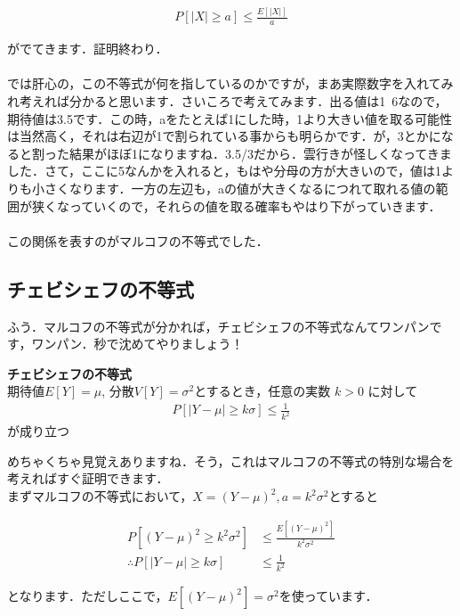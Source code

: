 \documentclass[11pt,a4paper,uplatex]{ujreport} 	%
\begin{document}
\begin{align}
  P[|X|\geq a] \leq \frac{E[|X|]}{a}
\end{align}

がでてきます．証明終わり．\\
\\

では肝心の，この不等式が何を指しているのかですが，まあ実際数字を入れてみれ考えれば分かると思います．さいころで考えてみます．出る値は1~6なので，期待値は3.5です．この時，aをたとえば1にした時，1より大きい値を取る可能性は当然高く，それは右辺が1で割られている事からも明らかです．が，3とかになると割った結果がほぼ1になりますね．3.5/3だから．雲行きが怪しくなってきました．さて，ここに5なんかを入れると，もはや分母の方が大きいので，値は1よりも小さくなります．一方の左辺も，aの値が大きくなるにつれて取れる値の範囲が狭くなっていくので，それらの値を取る確率もやはり下がっていきます．\\
\\

この関係を表すのがマルコフの不等式でした．

\subsection{チェビシェフの不等式}
ふう．マルコフの不等式が分かれば，チェビシェフの不等式なんてワンパンです，ワンパン．秒で沈めてやりましょう！

\begin{screen}
  \textbf{チェビシェフの不等式}\\
  期待値$E[Y] = \mu$, 分散$V[Y] = \sigma^2$とするとき，任意の実数 $k>0$ に対して
  \begin{align}
    P[|Y-\mu| \geq k\sigma] \leq \frac{1}{k^2}
    \label{eq:cheb}
  \end{align}
  が成り立つ
\end{screen}

めちゃくちゃ見覚えありますね．そう，これはマルコフの不等式の特別な場合を考えればすぐ証明できます．\\

まずマルコフの不等式において，$X=(Y-\mu)^2, a = k^2\sigma^2$とすると

\begin{align}
  P[(Y-\mu)^2 \geq k^2\sigma^2] &\leq \frac{E[(Y-\mu)^2]}{k^2\sigma^2}\\
  \therefore P[|Y-\mu| \geq k\sigma] &\leq \frac{1}{k^2}
\end{align}

となります．ただしここで，$E[(Y-\mu)^2]=\sigma^2$を使っています．\\\\
\end{document}
